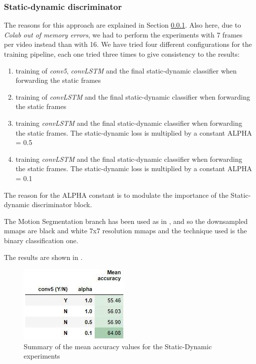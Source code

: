 \documentclass[10pt,twocolumn,hidelinks,letterpaper]{article}
\begin{document}
\subsubsection{Static-dynamic discriminator}
\label{ds_section}
The reasons for this approach are explained in Section \ref{ds_section}. Also here, due to \textit{Colab out of memory errors}, we had to perform the experiments with 7 frames per video instead than with 16. We have tried four different configurations for the training pipeline, each one tried three times to give consistency to the results:
\begin{enumerate}
  \item training of \textit{conv5}, \textit{convLSTM} and the final static-dynamic classifier when forwarding the static frames
  \item training of \textit{convLSTM} and the final static-dynamic classifier when forwarding the static frames
  \item training \textit{convLSTM} and the final static-dynamic classifier when forwarding the static frames. The static-dynamic loss is multiplied by a constant ALPHA = 0.5
  \item training \textit{convLSTM} and the final static-dynamic classifier when forwarding the static frames. The static-dynamic loss is multiplied by a constant ALPHA = 0.1
\end{enumerate}

The reason for the ALPHA constant is to modulate the importance of the Static-dynamic discriminator block.

The Motion Segmentation branch has been used as in \cite{sparnet}, and so the downsampled mmaps are black and white 7x7 resolution mmaps and the technique used is the binary classification one.

The results are shown in .

\begin{figure}[t]
  \centering
  \includegraphics[width=.6\linewidth]{images/step3.2_table.jpg}
  \caption{Summary of the mean accuracy values for the Static-Dynamic experiments}
  \label{DS_table}
\end{figure}
\end{document}
